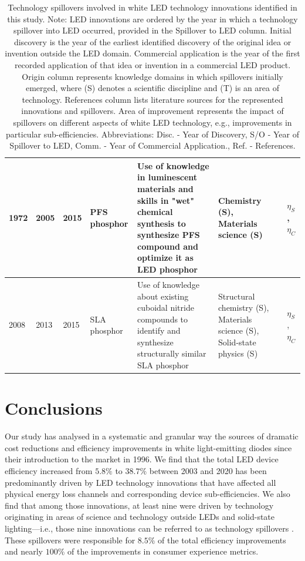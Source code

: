 \documentclass[twoside,twocolumn,9pt]{article}
\begin{document}
\begin{table}[h]
\begin{tabularx}{\textwidth}{|l|l|l|X|X|X|l|X|}
        1972 & 2005 & 2015 & PFS phosphor & Use of knowledge in luminescent materials and skills in "wet" chemical synthesis to synthesize PFS compound and optimize it as LED phosphor & Chemistry (S), Materials science (S) &\cite{paulusz1973efficient}\cite{radkov2009red}\cite{Murphy2015} & $\eta_S$, $\eta_C$ \\ \hline
        2008 & 2013 & 2015 & SLA phosphor & Use of knowledge about existing cuboidal nitride compounds to identify and synthesize structurally similar SLA phosphor & Structural chemistry (S), Materials science (S), Solid-state physics (S) &\cite{Park2008New}\cite{schmidt2013new}\cite{Pust2014} & $\eta_S$, $\eta_C$ \\ \hline
    \end{tabularx}
    \label{tab:spillovers}
    \caption{Technology spillovers involved in white LED technology innovations identified in this study. Note: LED innovations are ordered by the year in which a technology spillover into LED occurred, provided in the Spillover to LED column. Initial discovery is the year of the earliest identified discovery of the original idea or invention outside the LED domain. Commercial application is the year of the first recorded application of that idea or invention in a commercial LED product. Origin column represents knowledge domains in which spillovers initially emerged, where (S) denotes a scientific discipline and (T) is an area of technology. References column lists literature sources for the represented innovations and spillovers. Area of improvement represents the impact of spillovers on different aspects of white LED technology, e.g., improvements in particular sub-efficiencies. Abbreviations: Disc. - Year of Discovery, S/O - Year of Spillover to LED, Comm. - Year of Commercial Application., Ref. - References.}
\end{table}

\section{Conclusions}
Our study has analysed in a systematic and granular way the sources of dramatic cost reductions and efficiency improvements in white light-emitting diodes since their introduction to the market in 1996. We find that the total LED device efficiency increased from $5.8\%$ to $38.7\%$ between 2003 and 2020 has been predominantly driven by LED technology innovations that have affected all physical energy loss channels and corresponding device sub-efficiencies. We also find that among those innovations, at least nine were driven by technology originating in areas of science and technology outside LEDs and solid-state lighting—i.e., those nine innovations can be referred to as technology spillovers . These spillovers were responsible for $8.5\%$ of the total efficiency improvements and nearly $100\%$ of the improvements in consumer experience metrics. 
\end{document}
